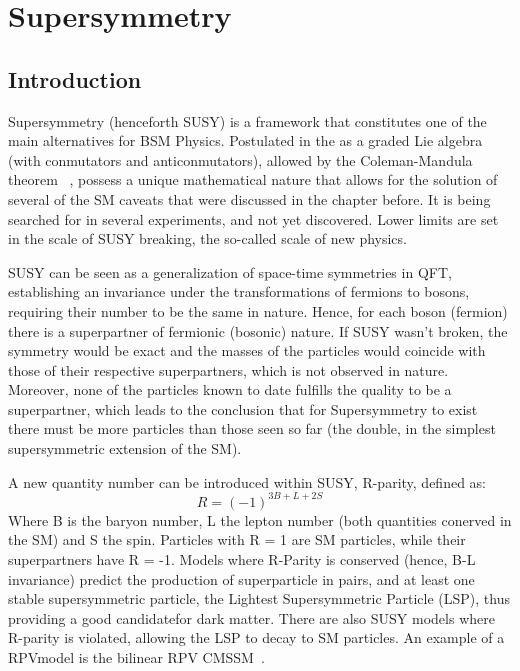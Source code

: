 \chapter{Supersymmetry}
\label{sec:sup}
\section{Introduction}
\label{sec:introduction}%
Supersymmetry (henceforth SUSY) is a framework that constitutes one of the main alternatives for BSM Physics. Postulated in the  as a graded Lie algebra (with conmutators and anticonmutators), allowed by the Coleman-Mandula theorem ~\cite{ColemanMandula}, possess a unique mathematical nature that allows for the solution of several of the SM caveats that were discussed in the chapter before. It is being searched for in several experiments, and not yet discovered. Lower limits are set in the scale of SUSY breaking, the so-called scale of new physics.   

SUSY can be seen as a generalization of space-time symmetries in QFT, establishing an invariance under the transformations of fermions to bosons, requiring their number to be the same in nature. Hence, for each boson (fermion) there is a superpartner of fermionic (bosonic) nature. If SUSY wasn't broken, the symmetry would be exact and the masses of the particles would coincide with those of their respective superpartners, which is not observed in nature. Moreover, none of the particles known to date fulfills the quality to be a superpartner, which leads to the conclusion that for Supersymmetry to exist there must be more particles than those seen so far (the double, in the simplest supersymmetric extension of the SM). 

A new quantity number can be introduced within SUSY, R-parity, defined as:
\begin{equation}
R = (-1)^{3B + L + 2S}
\end{equation}
Where B is the baryon number, L the lepton number (both quantities conerved in the SM) and S the spin. Particles with R = 1 are SM particles, while their superpartners have R = -1. Models where R-Parity is conserved (hence, B-L invariance) predict the production of superparticle in pairs, and at least one stable supersymmetric particle, the Lightest Supersymmetric Particle (LSP), thus providing a good candidatefor dark matter. There are also SUSY models where R-parity is violated, allowing the LSP to decay to SM particles. An example of a RPVmodel is the bilinear RPV CMSSM~\cite{RPVCMSSM}.%

